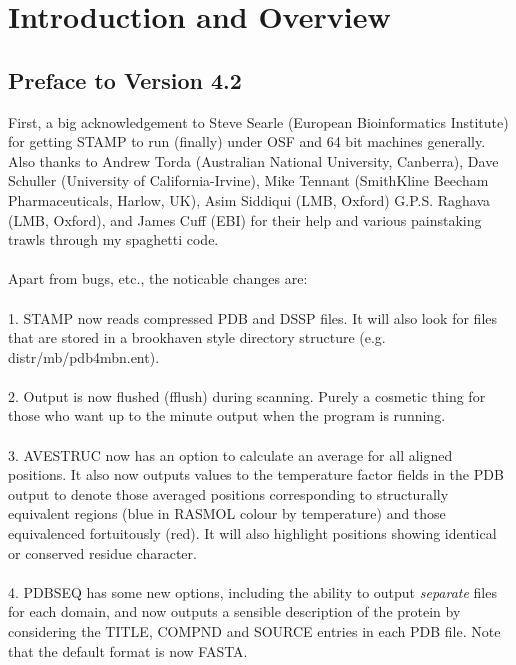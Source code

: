 \tableofcontents

\parindent 0in

\chapter{Introduction and Overview}

\section{Preface to Version 4.2}

First, a big acknowledgement to Steve Searle (European Bioinformatics Institute)
for getting STAMP to run (finally) under OSF and 64 bit machines generally.
Also thanks to Andrew Torda 
(Australian National University, Canberra), Dave Schuller (University of California-Irvine),
Mike Tennant (SmithKline Beecham Pharmaceuticals, Harlow, UK),
Asim Siddiqui (LMB, Oxford) G.P.S. Raghava (LMB, Oxford), and James Cuff (EBI)
for their help and various painstaking trawls through my spaghetti code.\\
\\
Apart from bugs, etc., the noticable changes are:\\
\\
1. STAMP now reads compressed PDB and DSSP files.  It will also look for files that
are stored in a brookhaven style directory structure (e.g. distr/mb/pdb4mbn.ent).\\
\\
2. Output is now flushed (fflush) during scanning.  Purely a cosmetic thing for those who
want up to the minute output when the program is running.\\
\\
3. AVESTRUC now has an option to calculate an average for all aligned positions.  It also
now outputs values to the temperature factor fields in the PDB output to denote those
averaged positions corresponding to structurally equivalent regions (blue in RASMOL 
colour by temperature) and those equivalenced fortuitously (red).  It will also highlight
positions showing identical or conserved residue character.\\
\\
4. PDBSEQ has some new options, including the ability to output {\em separate} files
for each domain, and now outputs a sensible description of the protein by
considering the TITLE, COMPND and SOURCE entries in each PDB file.  Note that the
default format is now FASTA.\\
\\
